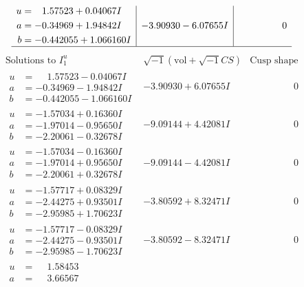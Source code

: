 \documentclass[1p]{elsarticle_modified}
\theoremstyle{definition}
\newcommand{\I}{\sqrt{-1}}
\begin{document}
$$\begin{array}{c|c|c}
\begin{aligned}
u &= \phantom{-}1.57523 + 0.04067 I \\
a &= -0.34969 + 1.94842 I \\
b &= -0.442055 + 1.066160 I\end{aligned}
 & -3.90930 - 6.07655 I & \phantom{-0.000000 } 0\\
 \hline 
 \end{array}$$\newpage$$\begin{array}{c|c|c}  
\text{Solutions to }I^u_{1}& \I (\text{vol} + \sqrt{-1}CS) & \text{Cusp shape}\\
 \hline 
\begin{aligned}
u &= \phantom{-}1.57523 - 0.04067 I \\
a &= -0.34969 - 1.94842 I \\
b &= -0.442055 - 1.066160 I\end{aligned}
 & -3.90930 + 6.07655 I & \phantom{-0.000000 } 0 \\ \hline\begin{aligned}
u &= -1.57034 + 0.16360 I \\
a &= -1.97014 - 0.95650 I \\
b &= -2.20061 - 0.32678 I\end{aligned}
 & -9.09144 + 4.42081 I & \phantom{-0.000000 } 0 \\ \hline\begin{aligned}
u &= -1.57034 - 0.16360 I \\
a &= -1.97014 + 0.95650 I \\
b &= -2.20061 + 0.32678 I\end{aligned}
 & -9.09144 - 4.42081 I & \phantom{-0.000000 } 0 \\ \hline\begin{aligned}
u &= -1.57717 + 0.08329 I \\
a &= -2.44275 + 0.93501 I \\
b &= -2.95985 + 1.70623 I\end{aligned}
 & -3.80592 + 8.32471 I & \phantom{-0.000000 } 0 \\ \hline\begin{aligned}
u &= -1.57717 - 0.08329 I \\
a &= -2.44275 - 0.93501 I \\
b &= -2.95985 - 1.70623 I\end{aligned}
 & -3.80592 - 8.32471 I & \phantom{-0.000000 } 0 \\ \hline\begin{aligned}
u &= \phantom{-}1.58453\phantom{ +0.000000I} \\
a &= \phantom{-}3.66567\phantom{ +0.000000I} \\

\end{aligned}
\end{array}$$
\end{document}
